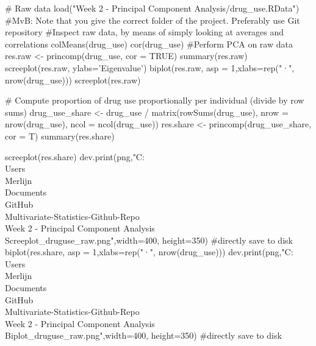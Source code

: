 \documentclass{article}\usepackage[]{graphicx}\usepackage[]{color}
\begin{document}
# Raw data
load("Week 2 - Principal Component Analysis/drug_use.RData") #MvB: Note that you give the correct folder of the project. Preferably use Git repository
#Inspect raw data, by means of simply looking at averages and correlations
colMeans(drug_use)
cor(drug_use)
#Perform PCA on raw data
res.raw <- princomp(drug_use, cor = TRUE)
summary(res.raw)
screeplot(res.raw, ylabs='Eigenvalue')
biplot(res.raw, asp = 1,xlabs=rep("·", nrow(drug_use)))
screeplot(res.raw)

# Compute proportion of drug use proportionally per individual (divide by row sums)
drug_use_share <- drug_use / matrix(rowSums(drug_use), nrow = nrow(drug_use), ncol = ncol(drug_use))
res.share <- princomp(drug_use_share, cor = T)
summary(res.share)

screeplot(res.share)
dev.print(png,"C:\\Users\\Merlijn\\Documents\\GitHub\\Multivariate-Statistics-Github-Repo\\Week 2 - Principal Component Analysis\\Screeplot_druguse_raw.png",width=400, height=350) #directly save to disk
biplot(res.share, asp = 1,xlabs=rep("·", nrow(drug_use)))
dev.print(png,"C:\\Users\\Merlijn\\Documents\\GitHub\\Multivariate-Statistics-Github-Repo\\Week 2 - Principal Component Analysis\\Biplot_druguse_raw.png",width=400, height=350) #directly save to disk
\end{document}
